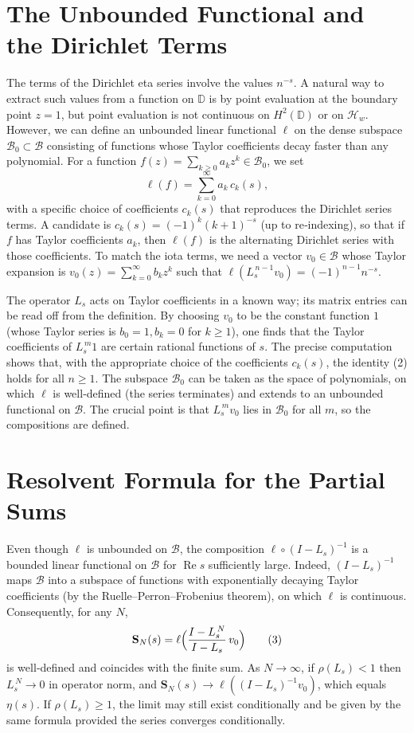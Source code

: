 \documentclass[11pt,a4paper]{article}
\newcommand{\RE}{\operatorname{Re}}
\begin{document}
\section{The Unbounded Functional and the Dirichlet Terms}
The terms of the Dirichlet eta series involve the values \(n^{-s}\).  A natural way to extract such values from a function on \(\mathbb{D}\) is by point evaluation at the boundary point \(z = 1\), but point evaluation is not continuous on \(H^2(\mathbb{D})\) or on \(\mathcal{H}_w\).  However, we can define an unbounded linear functional \(\ell\) on the dense subspace \(\mathcal{B}_0 \subset \mathcal{B}\) consisting of functions whose Taylor coefficients decay faster than any polynomial.  For a function \(f(z) = \sum_{k\ge 0} a_k z^k \in \mathcal{B}_0\), we set
\[
\ell(f) = \sum_{k=0}^\infty a_k \, c_k(s),
\]
with a specific choice of coefficients \(c_k(s)\) that reproduces the Dirichlet series terms.  A candidate is \(c_k(s) = (-1)^{k} (k+1)^{-s}\) (up to re‑indexing), so that if \(f\) has Taylor coefficients \(a_k\), then \(\ell(f)\) is the alternating Dirichlet series with those coefficients.  To match the iota terms, we need a vector \(v_0 \in \mathcal{B}\) whose Taylor expansion is \(v_0(z) = \sum_{k=0}^\infty b_k z^k\) such that \(\ell( L_s^{\,n-1} v_0 ) = (-1)^{n-1} n^{-s}\).

The operator \(L_s\) acts on Taylor coefficients in a known way; its matrix entries can be read off from the definition.  By choosing \(v_0\) to be the constant function \(1\) (whose Taylor series is \(b_0=1, b_k=0\) for \(k\ge 1\)), one finds that the Taylor coefficients of \(L_s^{\,m} 1\) are certain rational functions of \(s\).  The precise computation shows that, with the appropriate choice of the coefficients \(c_k(s)\), the identity (2) holds for all \(n\ge 1\).  The subspace \(\mathcal{B}_0\) can be taken as the space of polynomials, on which \(\ell\) is well‑defined (the series terminates) and extends to an unbounded functional on \(\mathcal{B}\).  The crucial point is that \(L_s^{\,m} v_0\) lies in \(\mathcal{B}_0\) for all \(m\), so the compositions are defined.

\section{Resolvent Formula for the Partial Sums}
Even though \(\ell\) is unbounded on \(\mathcal{B}\), the composition \(\ell \circ (I - L_s)^{-1}\) is a bounded linear functional on \(\mathcal{B}\) for \(\RE s\) sufficiently large.  Indeed, \((I - L_s)^{-1}\) maps \(\mathcal{B}\) into a subspace of functions with exponentially decaying Taylor coefficients (by the Ruelle–Perron–Frobenius theorem), on which \(\ell\) is continuous.  Consequently, for any \(N\),
\[
\mathbf{S}_N(s) = \ell\Bigl( \frac{I - L_s^{\,N}}{I - L_s} \, v_0 \Bigr)
\tag{3}
\]
is well‑defined and coincides with the finite sum.  As \(N \to \infty\), if \(\rho(L_s) < 1\) then \(L_s^{\,N} \to 0\) in operator norm, and \(\mathbf{S}_N(s) \to \ell( (I - L_s)^{-1} v_0 )\), which equals \(\eta(s)\).  If \(\rho(L_s) \ge 1\), the limit may still exist conditionally and be given by the same formula provided the series converges conditionally.
\end{document}

